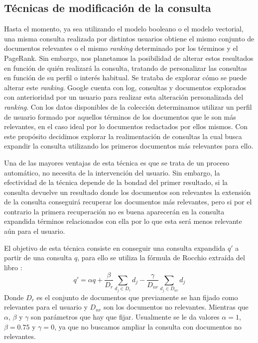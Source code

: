 \documentclass[size=a4, parskip=half, titlepage=false, toc=flat, toc=bib, 12pt, twoside]{scrartcl}
\theoremstyle{theorem-style}
\theoremstyle{definition-style}
\theoremstyle{remark-style}
\theoremstyle{example-style}
\theoremstyle{definition-style}
\theoremstyle{remark-style}
\begin{document}
\subsection{Técnicas de modificación de la consulta}
Hasta el momento, ya sea utilizando el modelo booleano o el modelo vectorial, una misma consulta realizada por distintos usuarios obtiene el mismo conjunto de documentos relevantes o el mismo \textit{ranking} determinado por los términos y el PageRank. Sin embargo, nos planetamos la posibilidad de alterar estos resultados en función de quién realizará la consulta, tratando de personalizar las consultas en función de su perfil o interés habitual. Se trataba de explorar cómo se puede alterar este \textit{ranking}. Google cuenta con log, consultas y documentos explorados con anterioridad por un usuario para realizar esta alteración personalizada del \textit{ranking}. Con los datos disponibles de la colección determinamos utilizar un perfil de usuario formado por aquellos términos de los documentos que le son más relevantes, en el caso ideal por lo documentos redactados por ellos mismos. Con este propósito decidimos explorar la realimentación de consultas la cual busca expandir la consulta utilizando los primeros documentos más relevantes para ello.

Una de las mayores ventajas de esta técnica es que se trata de un proceso automático, no necesita de la intervención del usuario. Sin embargo, la efectividad de la técnica depende de la bondad del primer resultado, si la consulta devuelve un resultado donde los documentos son relevantes la extensión de la consulta conseguirá recuperar los documentos más relevantes, pero si por el contrario la primera recuperación no es buena aparecerán en la consulta expandida términos relacionados con ella por lo que esta será menos relevante aún para el usuario.

El objetivo de esta técnica consiste en conseguir una consulta expandida $q'$ a partir de una consulta $q$, para ello se utiliza la fórmula de Rocchio extraída del libro \cite{ri}:
$$q' = \alpha q + \frac{\beta}{D_r} \sum_{d_j \in D_r} d_j - \frac{\gamma}{D_{nr}} \sum_{d_j \in D_{nr}} d_j $$
Donde $D_{r}$ es el conjunto de documentos que previamente se han fijado como relevantes para el usuario y $D_{nr}$ son los documentos no relevantes. Mientras que $\alpha$, $\beta$ y $\gamma$ son parámetros que hay que fijar. Usualmente se le da valores $\alpha = 1$, $\beta = 0.75$ y $\gamma = 0$, ya que no buscamos ampliar la consulta con documentos no relevantes.
\end{document}
